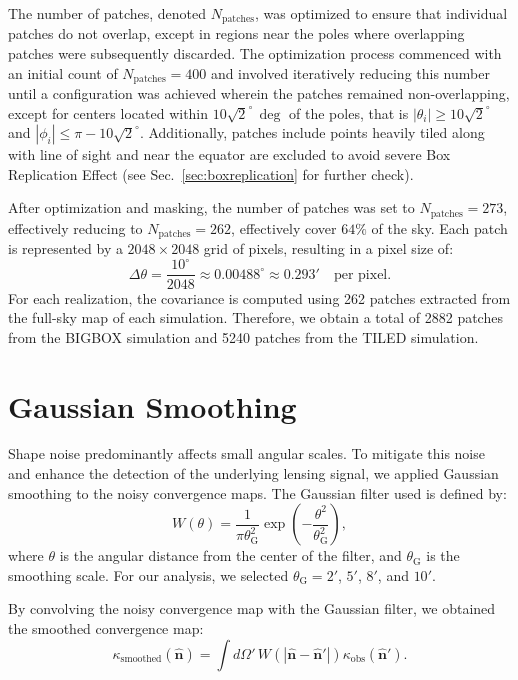 The number of patches, denoted \( N_{\text{patches}} \), was optimized to ensure that individual patches do not overlap, except in regions near the poles where overlapping patches were subsequently discarded. The optimization process commenced with an initial count of \( N_{\text{patches}} = 400 \) and involved iteratively reducing this number until a configuration was achieved wherein the patches remained non-overlapping, except for centers located within \( 10\sqrt{2}^\circ \, \mathrm{\deg}\) of the poles, that is $|\theta_i| \geq 10\sqrt{2}^\circ$ and $|\phi_i| \leq \pi - 10\sqrt{2}^\circ$. Additionally, patches include points heavily tiled along with line of sight and near the equator are excluded to avoid severe Box Replication Effect (see Sec.~\ref{sec:boxreplication} for further check).

After optimization and masking, the number of patches was set to $N_{\text{patches}} = 273$, effectively reducing to $N_{\text{patches}} = 262$, effectively cover $64 \%$ of the sky. 
Each patch is represented by a $2048 \times 2048$ grid of pixels, resulting in a pixel size of:
\begin{equation}
    \Delta \theta = \frac{10^\circ}{2048} \approx 0.00488^\circ \approx 0.293' \quad \text{per pixel}.
\end{equation}
For each realization, the covariance is computed using 262 patches extracted from the full-sky map of each simulation.
Therefore, we obtain a total of 2882 patches from the BIGBOX simulation and 5240 patches from the TILED simulation. 

\section{Gaussian Smoothing}
Shape noise predominantly affects small angular scales. To mitigate this noise and enhance the detection of the underlying lensing signal, we applied Gaussian smoothing to the noisy convergence maps. The Gaussian filter used is defined by:
\begin{equation}
    W(\theta) = \frac{1}{\pi \theta_{\mathrm{G}}^2} \exp\left( -\frac{\theta^2}{\theta_{\mathrm{G}}^2} \right),
\end{equation}
where $\theta$ is the angular distance from the center of the filter, and $\theta_{\mathrm{G}}$ is the smoothing scale. For our analysis, we selected $\theta_{\mathrm{G}} = 2'$, $5'$, $8'$, and $10'$.

By convolving the noisy convergence map with the Gaussian filter, we obtained the smoothed convergence map:
\begin{equation}
    \kappa_{\mathrm{smoothed}}(\hat{\mathbf{n}}) = \int d\Omega' \, W(|\hat{\mathbf{n}} - \hat{\mathbf{n}}'|) \kappa_{\mathrm{obs}}(\hat{\mathbf{n}}').
\end{equation}

